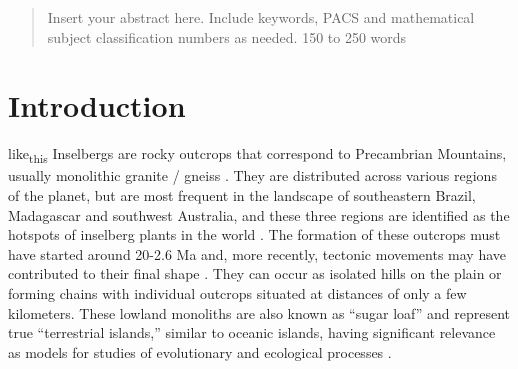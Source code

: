 

\date{Received: date / Accepted: date}


\maketitle

\begin{abstract}
Insert your abstract here. Include keywords, PACS and mathematical
subject classification numbers as needed. 150 to 250 words
\end{abstract}

\section{Introduction}
\label{intro}
like\textsubscript{this}
Inselbergs are rocky outcrops that correspond to Precambrian Mountains, usually monolithic granite / gneiss \citep{bremer2000InselbergsGeomorphologyGeoecology}. They are distributed across various regions of the planet, but are most frequent in the landscape of southeastern Brazil, Madagascar and southwest Australia, and these three regions are identified as the hotspots of inselberg plants in the world \citep{porembski2007TropicalInselbergsHabitat}. The formation of these outcrops must have started around 20-2.6 Ma and, more recently, tectonic movements may have contributed to their final shape \citep{varajao2015PancasKingdomBornhardts}. They can occur as isolated hills on the plain or forming chains with individual outcrops situated at distances of only a few kilometers. These lowland monoliths are also known as “sugar loaf” \citep{porembski2000IslandsIslandsHabitatsa} and represent true “terrestrial islands,” similar to oceanic islands, having significant relevance as models for studies of evolutionary and ecological processes \citep{porembski2000IslandsIslandsHabitatsa}. 

